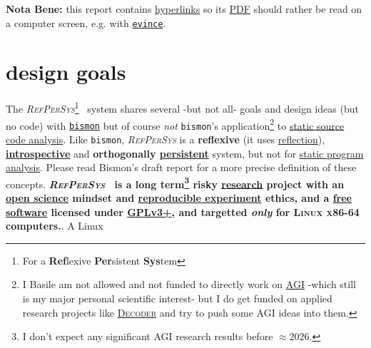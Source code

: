 \documentclass[11pt,a4paper,svgnames]{techreport}
\newcommand{\RefPerSys}{{\textit{\textsc{RefPerSys}}}}
\begin{document}
\begin{titlepage}
  \medskip
  \textbf{Nota Bene:} this report contains
  \href{https://en.wikipedia.org/wiki/Hyperlink}{hyperlinks} so its
  \href{https://en.wikipedia.org/wiki/PDF}{PDF} should rather be read
  on a computer screen, e.g. with
  \href{https://en.wikipedia.org/wiki/Evince}{\texttt{evince}}.
  
\end{titlepage}



\tableofcontents

\bigskip


\section{design goals}

The \RefPerSys\footnote{For a \textbf{Ref}lexive \textbf{Per}sistent
\textbf{Sys}tem}~ system shares several -but not all- goals and design
ideas (but no code) with
\href{http://github.com/bstarynk/bismon}{\texttt{bismon}}
\cite{Starynkevitch:2019:bismon-draft} but of course \emph{not}
\texttt{bismon}'s application\footnote{I Basile am not allowed and not
funded to directly work on
\href{https://en.wikipedia.org/wiki/Artificial_general_intelligence}{AGI}
-which still is my major personal scientific interest- but I do get
funded on applied research projects like
\href{https://www.decoder-project.eu/}{\textsc{Decoder}} and try to
push some AGI ideas into them.} to
\href{https://en.wikipedia.org/wiki/Static_program_analysis}{static
  source code analysis}. Like \texttt{bismon}, {\RefPerSys} is a
\textbf{reflexive} (it uses
\href{https://en.wikipedia.org/wiki/Reflection_(computer_programming)}{reflection}), \textbf{\href{https://en.wikipedia.org/wiki/Virtual\_machine\_introspection}{introspective}}
and \textbf{orthogonally
  \href{https://en.wikipedia.org/wiki/Persistence_(computer_science)}{persistent}}
system, but not for
\href{https://en.wikipedia.org/wiki/Static_program_analysis}{static
  program analysis}. Please read Bismon's draft report
\cite{Starynkevitch:2019:bismon-draft} for a more precise definition of
these concepts. \textbf{\RefPerSys~ is a long term\footnote{I don't
  expect any significant AGI research results before $\approx 2026$.}
  risky \href{https://en.wikipedia.org/wiki/Research}{research}
  project with an
  \href{https://en.wikipedia.org/wiki/Open_science}{open science}
  mindset and
  \href{https://ropensci.github.io/reproducibility-guide/sections/introduction/}{reproducible
    experiment} ethics, and a
  \href{https://www.gnu.org/philosophy/free-sw.en.html}{free software}
  licensed under
  \href{https://www.gnu.org/licenses/gpl-3.0.html}{GPLv3+}, and
  targetted \emph{only} for \textsc{Linux x86-64} computers.}. A Linux
\end{document}
